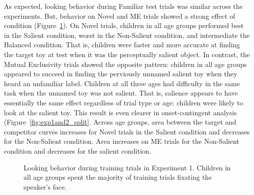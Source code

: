 \documentclass[man,floatsintext]{apa6}
\begin{document}
As expected, looking behavior during Familiar test trials was similar across the experiments. But, behavior on Novel and ME trials showed a strong effect of condition (Figure~\ref{fig:exp1and2_test_spaghetti}). On Novel trials, children in all age groups performed best in the Salient condition, worst in the Non-Salient condition, and intermediate the Balanced condition. That is, children were faster and more accurate at finding the target toy at test when it was the perceptually salient object. In contrast, the Mutual Exclusivity trials showed the opposite pattern: children in all age groups appeared to succeed in finding the perviously unnamed salient toy when they heard an unfamiliar label. Children at all three ages had difficulty in the same task when the unnamed toy was not salient. That is, salience appears to have essentially the same effect regardless of trial type or age: children were likely to look at the salient toy. This result is even clearer in onset-contingent analysis (Figure~\ref{fig:exp1and2_split}. Across age groups, area between the target and competitor curves increases for Novel trials in the Salient condition and decreases for the Non-Salient condition. Area increases on ME trials for the Non-Salient condition and decreases for the salient condition.

\begin{figure}[tb]
	\caption{\label{fig:exp1and2_test_spaghetti} Looking behavior during training trials in Experiment 1. Children in all age groups spent the majority of training trials fixating the speaker's face.}
\end{figure}
\end{document}

